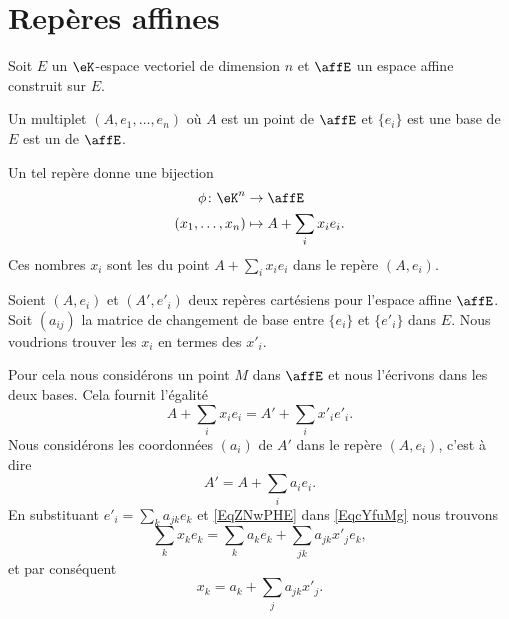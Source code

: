 \section{Repères affines}

Soit \( E\) un \( \eK\)-espace vectoriel de dimension \( n\) et \( \affE\) un espace affine construit sur \( E\).
\begin{definition}      \label{DEFooQELZooEXvxgw}
    Un multiplet \( (A,e_1,\ldots, e_n)\) où \( A\) est un point de \( \affE\) et \( \{ e_i \}\) est une base de \( E\) est un  de \( \affE\).
\end{definition}
Un tel repère donne une bijection
\begin{equation}
    \begin{aligned}
        \phi\colon \eK^n&\to \affE \\
        (x_1,\ldots, x_n)&\mapsto A+\sum_ix_ie_i.
    \end{aligned}
\end{equation}
Ces nombres \( x_i\) sont les  du point \( A+\sum_ix_ie_i\) dans le repère \( (A,e_i)\).

Soient \( (A,e_i)\) et \( (A',e'_i)\) deux repères cartésiens pour l'espace affine \( \affE\). Soit \( (a_{ij})\) la matrice de changement de base entre \( \{ e_i \}\) et \( \{ e'_i \}\) dans \( E\). Nous voudrions trouver les \( x_i\) en termes des \( x'_i\).

Pour cela nous considérons un point \( M\) dans \( \affE\) et nous l'écrivons dans les deux bases. Cela fournit l'égalité
\begin{equation}        \label{EqcYfuMg}
    A+\sum_ix_ie_i=A'+\sum_ix'_ie'_i.
\end{equation}
Nous considérons les coordonnées \( (a_i)\) de \( A'\) dans le repère \( (A,e_i)\), c'est à dire
\begin{equation}    \label{EqZNwPHE}
    A'=A+\sum_ia_ie_i.
\end{equation}
En substituant \( e'_i=\sum_ka_{jk}e_k\) et \eqref{EqZNwPHE} dans \eqref{EqcYfuMg} nous trouvons
\begin{equation}
    \sum_kx_ke_k=\sum_ka_ke_k+\sum_{jk}a_{jk}x'_je_k,
\end{equation}
et par conséquent
\begin{equation}
    x_k=a_k+\sum_ja_{jk}x'_j.
\end{equation}

